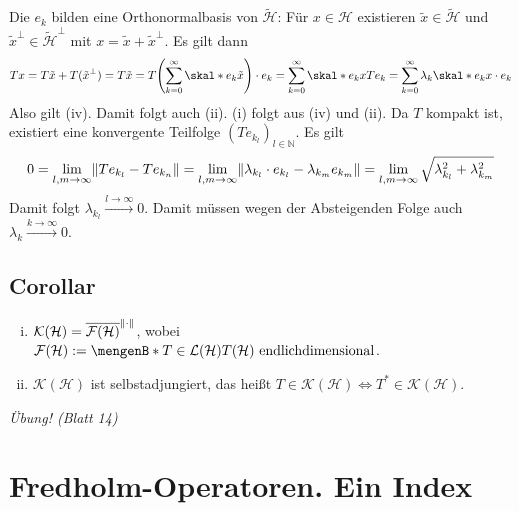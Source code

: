 Die $e_k$ bilden eine Orthonormalbasis von $\tilde{\mathcal{H}}$: Für $x \in \mathcal{H}$ existieren $\tilde{x} \in \tilde{\mathcal{H}}$ und $\tilde{x}^\bot \in \tilde{\mathcal{H}}^\bot$ mit $x= \tilde{x} + \tilde{x}^\bot$. Es gilt dann 
\[
	T x = T \tilde{x} + T(\tilde{x}^\bot) = T \tilde{x} = T \enbrace*{\sum_{k=0}^{\infty} \skal*{e_k}{\tilde{x}}} \cdot e_k = \sum_{k=0}^{\infty} \skal*{e_k}{x} T e_k
	= \sum_{k=0}^{\infty} \lambda_k \skal*{e_k}{x} \cdot e_k 
\]
Also gilt (iv). Damit folgt auch (ii). (i) folgt aus (iv) und (ii). Da $T$ kompakt ist, existiert eine konvergente Teilfolge $(T e_{k_l})_{l \in \mathds{N}}$. Es gilt
\[
	0=\lim_{l,m \to \infty} \norm{T e_{k_l} - T e_{k_n}} = \lim_{l,m \to \infty} \norm{\lambda_{k_l} \cdot e_{k_l} - \lambda_{k_m} e_{k_m}} = 
	\lim_{l,m \to \infty}  \sqrt{\lambda_{k_l}^2 + \lambda_{k_m}^2}  
\]
Damit folgt $\lambda_{k_l} \xrightarrow{l \to \infty} 0$. Damit müssen wegen der Absteigenden Folge auch $\lambda_k \xrightarrow{k \to \infty} 0$. \bewende

\subsection[Corollar: Approximierbarkeit kompakter Operatoren und $\mathcal{K}(\mathcal{H})$ ist selbstadjungiert]{Corollar} %
\label{sub:811}
\begin{enumerate}[(i)]
	\item $\mathcal{K}(\mathcal{H})= \overline{\mathcal{F}(\mathcal{H})}^{\norm{\cdot}}$, wobei 
	$\mathcal{F}(\mathcal{H}) := \set[T \in \mathcal{L}(\mathcal{H})]{T(\mathcal{H}) \text{ endlichdimensional}}$.
	\item $\mathcal{K}(\mathcal{H})$ ist selbstadjungiert, das heißt $T \in \mathcal{K}(\mathcal{H}) \iff T^* \in \mathcal{K}(\mathcal{H})$.
\end{enumerate}
\emph{Übung! (Blatt 14)} \bewende
\newpage

\section{Fredholm-Operatoren. Ein Index} %
\label{sec:9}

